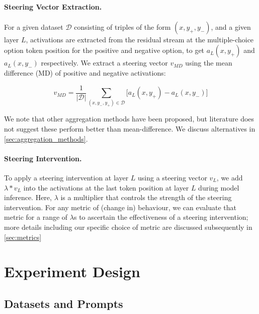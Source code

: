 \documentclass{article}
\begin{document}
\paragraph{Steering Vector Extraction.} For a given dataset $\mathcal{D}$ consisting of triples of the form $(x, y_{+}, y_-)$, and a given layer $L$, activations are extracted from the residual stream at the multiple-choice option token position for the positive and negative option, to get $a_L(x, y_{+})$ and $a_L(x, y_{-})$ respectively. We extract a steering vector $v_{MD}$ using the mean difference (MD) of positive and negative activations:

\begin{equation}
    v_{MD} = \frac{1}{|\mathcal{D}|} \sum_{(x, y_-, y_+) \in \mathcal{D}}{\big[a_L(x, y_+) - a_L(x, y_-)\big]}
\end{equation}

We note that other aggregation methods have been proposed, but literature does not suggest these perform better than mean-difference. We discuss alternatives in \cref{sec:aggregation_methods}. 

\paragraph{Steering Intervention.} To apply a steering intervention at layer $L$ using a steering vector $v_L$, we add $\lambda * v_L$ into the activations at the last token position at layer $L$ during model inference. Here, $\lambda$ is a multiplier that controls the strength of the steering intervention. For any metric of (change in) behaviour, we can evaluate that metric for a range of $\lambda$s to ascertain the effectiveness of a steering intervention; more details including our specific choice of metric are discussed subsequently in \cref{sec:metrics}

\section{Experiment Design}\label{sec:exps}

\subsection{Datasets and Prompts}
\end{document}
